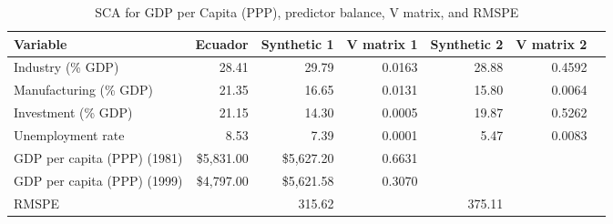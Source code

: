 \begin{table}[!h]
\begin{center}
\caption{SCA for GDP per Capita (PPP), predictor balance, V matrix, and RMSPE} \label{table:GDP_balance}
\begin{tabular}{l r r r r r r}     \\ \toprule
  Variable                    &    Ecuador &  Synthetic 1 & V matrix 1 & Synthetic 2 & V matrix 2 \\ \midrule 
  Industry (\% GDP)           &      28.41 &        29.79 &     0.0163 &       28.88 &     0.4592 \\
  Manufacturing (\% GDP)      &      21.35 &        16.65 &     0.0131 &       15.80 &     0.0064 \\
  Investment (\% GDP)         &      21.15 &        14.30 &     0.0005 &       19.87 &     0.5262 \\
  Unemployment rate           &       8.53 &         7.39 &     0.0001 &        5.47 &     0.0083 \\ \midrule
  GDP per capita (PPP) (1981) & \$5,831.00 &   \$5,627.20 &     0.6631 &             &            \\
  GDP per capita (PPP) (1999) & \$4,797.00 &   \$5,621.58 &     0.3070 &             &            \\ \midrule
  RMSPE                       &            &       315.62 &            &      375.11 &            \\
  \bottomrule 
\end{tabular}
\end{center}
\end{table}